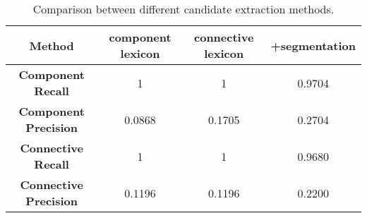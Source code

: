 \begin{table}[ht]
\centering
\begin{tabular}{|c|c|c|c|}
\hline
\bf Method                  & component lexicon & connective lexicon & +segmentation \\ \hline

\bf Component Recall        & 1                 & 1                  & 0.9704        \\ \hline
\bf Component Precision     & 0.0868            & 0.1705             & 0.2704        \\

\hhline{|=|=|=|=|}

\bf Connective Recall       & 1                 & 1                  & 0.9680        \\ \hline
\bf Connective Precision    & 0.1196            & 0.1196             & 0.2200        \\ \hline

\end{tabular}
\caption{\label{t:cand-extract} Comparison between different candidate extraction methods.}
\end{table}
